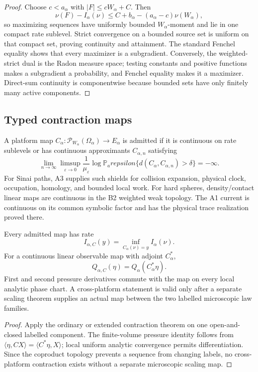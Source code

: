 \begin{proof}
Choose \(c<a_\alpha\) with \(|F|\le cW_\alpha+C\).  Then
\[
\nu(F)-I_\alpha(\nu)
\le C+b_\alpha-(a_\alpha-c)\nu(W_\alpha),
\]
so maximizing sequences have uniformly bounded \(W_\alpha\)-moment and lie in
one compact rate sublevel.  Strict convergence on a bounded source set is
uniform on that compact set, proving continuity and attainment.  The standard
Fenchel equality shows that every maximizer is a subgradient.  Conversely, the
weighted-strict dual is the Radon measure space; testing constants and positive
functions makes a subgradient a probability, and Fenchel equality makes it a
maximizer.  Direct-sum continuity is componentwise because bounded sets have
only finitely many active components.
\end{proof}

\subsection{Typed contraction maps}

A platform map
\(C_\alpha:\mathcal P_{W_\alpha}(\Omega_\alpha)\to E_\alpha\) is admitted if
it is continuous on rate sublevels or has continuous approximants
\(C_{\alpha,n}\) satisfying
\[
\lim_{n\to\infty}\limsup_{\varepsilon\to0}
\frac1{\mu_\varepsilon}\log
\mathbb P_arepsilon
\{d(C_\alpha,C_{\alpha,n})>\delta\}=-\infty.
\]
For Sinai paths, A3 supplies such shields for collision expansion, physical
clock, occupation, homology, and bounded local work.  For hard spheres,
density/contact linear maps are continuous in the B2 weighted weak topology.
The A1 current is continuous on its common symbolic factor and has the
physical trace realization proved there.

\begin{theorem}
\label{thm:r6-c2-contraction}
Every admitted map has rate
\[
I_{\alpha,C}(y)=\inf_{C_\alpha(\nu)=y}I_\alpha(\nu).
\]
For a continuous linear observable map with adjoint \(C_\alpha^*\),
\[
Q_{\alpha,C}(\eta)=Q_\alpha(C_\alpha^*\eta).
\]
First and second pressure derivatives commute with the map on every local
analytic phase chart.  A cross-platform statement is valid only after a
separate scaling theorem supplies an actual map between the two labelled
microscopic law families.
\end{theorem}

\begin{proof}
Apply the ordinary or extended contraction theorem on one open-and-closed
labelled component.  The finite-volume pressure identity follows from
\(\langle\eta,CX\rangle=\langle C^*\eta,X\rangle\); local uniform analytic
convergence permits differentiation.  Since the coproduct topology prevents a
sequence from changing labels, no cross-platform contraction exists without a
separate microscopic scaling map.
\end{proof}

